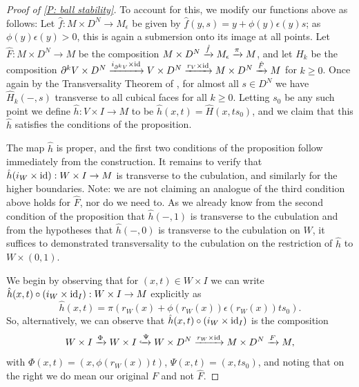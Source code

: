 \begin{proof}[Proof of \cref{P: ball stability}]
To account for this, we modify our functions above as follows: Let $\hat f: M\times D^N\to M_\epsilon$ be given by $\hat f(y, s)=y +\phi(y) \epsilon(y) s$; as $\phi(y)\epsilon(y)>0$, this is again a submersion onto its image at all points. Let  $\hat F:M\times D^N\to M$ be the composition $M\times D^N\xrightarrow{\hat f}M_\epsilon \xrightarrow{\pi}M$, and let  $\hat H_k$ be the composition $\partial^kV\times D^N\xrightarrow{i_{\partial^kV}\times \mathrm{id}}V\times D^N\xrightarrow{r_V\times \mathrm{id}} M\times D^N\xrightarrow{\hat F} M$ for $k\geq 0$. Once again by the Transversality Theorem of \cite[Section 2.3]{GuPo74}, for almost all $s\in D^N$ we have $\hat H_k(-,s)$ transverse to all cubical faces for all $k\geq 0$. Letting $s_0$ be any such point we define $\hat h:V\times I\to M$ to be  $\hat h(x,t)=\hat H(x,ts_0)$, and we claim that this $\hat h$ satisfies the conditions of the proposition. 

The map $\hat h$ is proper, and the first two conditions of the proposition follow immediately from the construction. It remains to verify that $\hat h (i_W\times \mathrm{id}):W\times I\to M$ is transverse to the cubulation, and similarly for the higher boundaries. Note: we are not claiming an analogue of the third condition above holds for $\hat F$, nor do we need to. As we already know from the second condition of the proposition that $\hat h(-,1)$ is transverse to the cubulation and from the hypotheses that  $\hat h(-,0)$  is transverse to the cubulation on $W$, it suffices to demonstrated transversality to the cubulation on the restriction of $\hat h$ to $W\times (0,1)$. 

We begin by observing that for $(x,t)\in W\times I$ we can write $\hat h(x,t)\circ (i_W\times \mathrm{id}_I):W\times I\to M$ explicitly as 
$$\hat h(x,t)=\pi(r_W(x)+\phi(r_W(x))\epsilon(r_W(x))ts_0).$$
So, alternatively, we can observe that $\hat h(x,t)\circ (i_W\times \mathrm{id}_I)$ is the composition 
\begin{equation}\label{E: alt hat h}
W\times I\xrightarrow{\Phi} W\times I \xhookrightarrow{\Psi} W\times D^N \xrightarrow{r_W\times \mathrm{id}} M\times D^N\xrightarrow{F} M,
\end{equation}
with $\Phi(x,t)=(x,\phi(r_W(x))t)$, $\Psi(x,t)=(x,ts_0)$, and noting that on the right we do mean our original $F$ and not $\hat F$. 


\end{proof}
